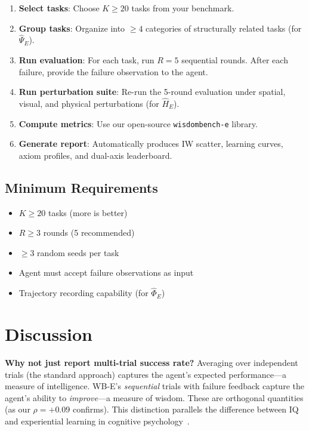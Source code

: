 \documentclass{article}
\begin{document}
\begin{enumerate}[leftmargin=*,itemsep=2pt]
    \item \textbf{Select tasks}: Choose $K \geq 20$ tasks from your benchmark.
    \item \textbf{Group tasks}: Organize into $\geq 4$ categories of structurally related tasks (for $\hat{\Psi}_E$).
    \item \textbf{Run evaluation}: For each task, run $R = 5$ sequential rounds.
    After each failure, provide the failure observation to the agent.
    \item \textbf{Run perturbation suite}: Re-run the 5-round evaluation under spatial, visual, and physical perturbations (for $\hat{H}_E$).
    \item \textbf{Compute metrics}: Use our open-source \texttt{wisdombench-e} library.
    \item \textbf{Generate report}: Automatically produces IW scatter, learning curves, axiom profiles, and dual-axis leaderboard.
\end{enumerate}

\subsection{Minimum Requirements}

\begin{itemize}[leftmargin=*,itemsep=1pt]
    \item $K \geq 20$ tasks (more is better)
    \item $R \geq 3$ rounds (5 recommended)
    \item $\geq 3$ random seeds per task
    \item Agent must accept failure observations as input
    \item Trajectory recording capability (for $\hat{\Phi}_E$)
\end{itemize}

\section{Discussion}
\label{sec:discussion}

\textbf{Why not just report multi-trial success rate?}
Averaging over independent trials (the standard approach) captures the agent's expected performance---a measure of intelligence.
WB-E's \emph{sequential} trials with failure feedback capture the agent's ability to \emph{improve}---a measure of wisdom.
These are orthogonal quantities (as our $\rho = +0.09$ confirms).
This distinction parallels the difference between IQ and experiential learning in cognitive psychology~\citep{sternberg1985beyond}.
\end{document}
